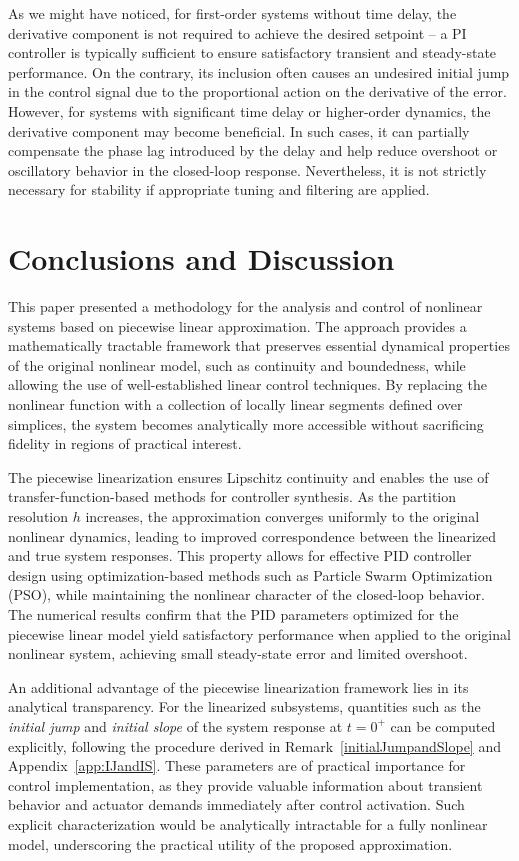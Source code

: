 \documentclass[preprint,12pt]{elsarticle}
\begin{document}
As we might have noticed, for first-order systems without time delay, the derivative component is not required to achieve the desired setpoint -- a PI controller is typically sufficient to ensure satisfactory transient and steady-state performance. On the contrary, its inclusion often causes an undesired initial jump in the control signal due to the proportional action on the derivative of the error.
However, for systems with significant time delay or higher-order dynamics, the derivative component may become beneficial. In such cases, it can partially compensate the phase lag introduced by the delay and help reduce overshoot or oscillatory behavior in the closed-loop response. Nevertheless, it is not strictly necessary for stability if appropriate tuning and filtering are applied.


\section*{Conclusions and Discussion}

This paper presented a methodology for the analysis and control of nonlinear systems based on piecewise linear approximation. 
The approach provides a mathematically tractable framework that preserves essential dynamical properties of the original nonlinear model, such as continuity and boundedness, while allowing the use of well-established linear control techniques. 
By replacing the nonlinear function with a collection of locally linear segments defined over simplices, the system becomes analytically more accessible without sacrificing fidelity in regions of practical interest.

The piecewise linearization ensures Lipschitz continuity and enables the use of transfer-function-based methods for controller synthesis. 
As the partition resolution \(h\) increases, the approximation converges uniformly to the original nonlinear dynamics, leading to improved correspondence between the linearized and true system responses. 
This property allows for effective PID controller design using optimization-based methods such as Particle Swarm Optimization (PSO), while maintaining the nonlinear character of the closed-loop behavior. 
The numerical results confirm that the PID parameters optimized for the piecewise linear model yield satisfactory performance when applied to the original nonlinear system, achieving small steady-state error and limited overshoot.

An additional advantage of the piecewise linearization framework lies in its analytical transparency. 
For the linearized subsystems, quantities such as the \emph{initial jump} and \emph{initial slope} of the system response at \(t = 0^+\) can be computed explicitly, following the procedure derived in Remark~\ref{initialJumpandSlope} and Appendix~\ref{app:IJandIS}. 
These parameters are of practical importance for control implementation, as they provide valuable information about transient behavior and actuator demands immediately after control activation. 
Such explicit characterization would be analytically intractable for a fully nonlinear model, underscoring the practical utility of the proposed approximation.
\end{document}
